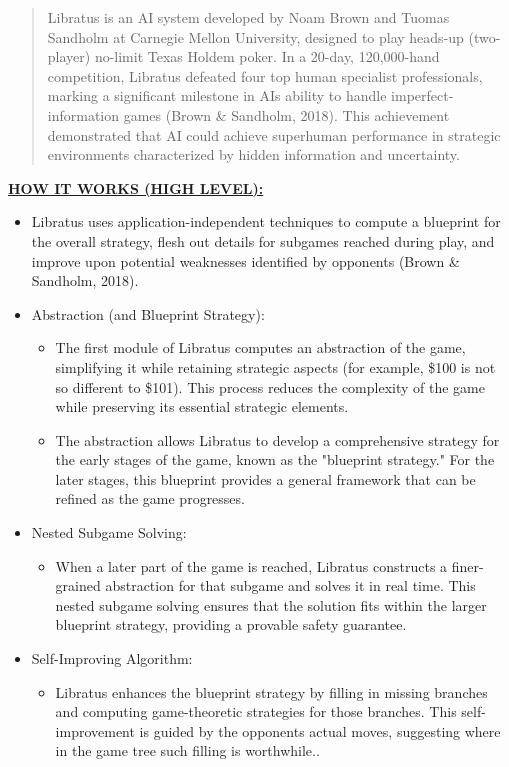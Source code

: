 \documentclass[
]{article}
\begin{document}
\begin{quote}
Libratus is an AI system developed by Noam Brown and Tuomas Sandholm at
Carnegie Mellon University, designed to play heads-up (two-player)
no-limit Texas Hold\textquotesingle em poker. In a 20-day, 120,000-hand
competition, Libratus defeated four top human specialist professionals,
marking a significant milestone in AI\textquotesingle s ability to
handle imperfect-information games (Brown \& Sandholm, 2018). This
achievement demonstrated that AI could achieve superhuman performance in
strategic environments characterized by hidden information and
uncertainty.
\end{quote}

\textbf{\ul{HOW IT WORKS (HIGH LEVEL):}}

\begin{itemize}
\item
  Libratus uses application-independent techniques to compute a
  blueprint for the overall strategy, flesh out details for subgames
  reached during play, and improve upon potential weaknesses identified
  by opponents (Brown \& Sandholm, 2018).
\item
  Abstraction (and Blueprint Strategy):

  \begin{itemize}
  \item
    The first module of Libratus computes an abstraction of the game,
    simplifying it while retaining strategic aspects (for example, \$100
    is not so different to \$101). This process reduces the complexity
    of the game while preserving its essential strategic elements.
  \item
    The abstraction allows Libratus to develop a comprehensive strategy
    for the early stages of the game, known as the "blueprint strategy."
    For the later stages, this blueprint provides a general framework
    that can be refined as the game progresses.
  \end{itemize}
\item
  Nested Subgame Solving:

  \begin{itemize}
  \item
    When a later part of the game is reached, Libratus constructs a
    finer-grained abstraction for that subgame and solves it in real
    time. This nested subgame solving ensures that the solution fits
    within the larger blueprint strategy, providing a provable safety
    guarantee.
  \end{itemize}
\item
  Self-Improving Algorithm:

  \begin{itemize}
  \item
    Libratus enhances the blueprint strategy by filling in missing
    branches and computing game-theoretic strategies for those branches.
    This self-improvement is guided by the opponents\textquotesingle{}
    actual moves, suggesting where in the game tree such filling is
    worthwhile..
  \end{itemize}
\end{itemize}
\end{document}
